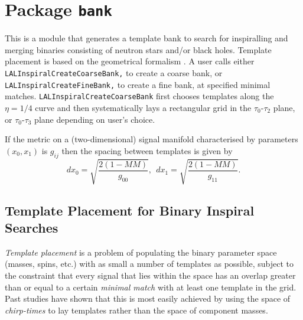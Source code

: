 \chapter{Package \texttt{bank}}

This is a module that generates a template bank to search for
inspiralling and merging binaries consisting of neutron stars
and/or black holes. Template placement is based on the geometrical
formalism \cite{Owen:96,OwenAndSathyaprakash:99}.  A user 
calls either \texttt{LALInspiralCreateCoarseBank,} 
to create a coarse bank, or \texttt{LALInspiralCreateFineBank,} 
to create a fine bank, at specified minimal matches.  
\texttt{LALInspiralCreateCoarseBank} first chooses templates
along the $\eta=1/4$ curve and then systematically lays a 
rectangular grid in the $\tau_0$-$\tau_2$ plane, or $\tau_0$-$\tau_3$
plane depending on user's choice.

If the metric on a (two-dimensional) signal manifold characterised 
by parameters $(x_0,x_1)$ is $g_{ij}$ then the spacing between templates 
is given by
\begin{equation}
   dx_0 = \sqrt{ \frac{2(1 -MM)}{g_{00}} },\ \ 
   dx_1 = \sqrt{ \frac{2(1 -MM)}{g_{11}} }.
\end{equation}
 
\section{Template Placement for Binary Inspiral Searches}
{\it Template placement} is a problem of populating the binary 
parameter space (masses, spins, etc.) with as small a number of 
templates as possible, subject to the constraint that every signal 
that lies within the space has an overlap greater 
than or equal to a certain {\it minimal match} with at least one template in 
the grid. Past studies \cite {Sathyaprakash and Dhurandhar 1991, Sathyaprakash 1994, OwenAndSathyaprakash:99}
have shown that this is most easily achieved by using the space of
{\it chirp-times} to lay templates rather than the space of component masses. 

